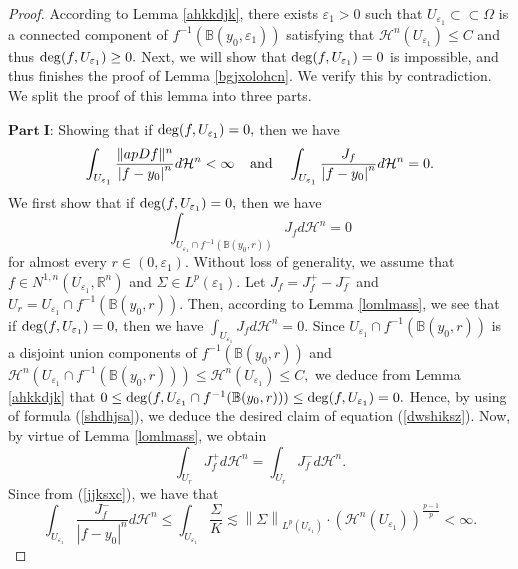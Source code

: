 \documentclass[11pt,twoside]{article}
\theoremstyle{definition}
\theoremstyle{remark}
\newcommand{\abs}[1]{\left|#1\right|}
\newcommand{\aleq}{\lesssim}
\begin{document}
\begin{proof}
According to Lemma \ref{ahkkdjk}, there exists $\varepsilon_{1}>0$ such that $U_{\varepsilon_{1}}\subset\subset\Omega$ is a connected component of $f^{-1}(\mathbb{B}(y_{0},\varepsilon_{1}))$ satisfying that 
$\mathcal{H}^{n}(U_{\varepsilon_{1}})\leq C$ and thus ${\rm deg}(f,U_{\varepsilon_{1}})\geq0.$ Next, we will show that  ${\rm deg}(f,U_{\varepsilon_{1}})=0$ is impossible, and thus finishes the proof of 
Lemma \ref{bgjxolohcn}. We verify this by contradiction. We split the proof of this lemma into three parts.

$\mathbf{Part}\;\mathbf{I}$: Showing that if ${\rm deg}(f,U_{\varepsilon_{1}})=0,$ then we have 
$$\int_{U_{\varepsilon_{1}}}\frac{\|apDf\|^{n}}{\abs{f-y_{0}}^{n}}d\mathcal{H}^{n}<\infty\;\;\;\;{\rm and }\;\;\;\;\int_{U_{\varepsilon_{1}}}\frac{J_{f}}{\abs{f-y_{0}}^{n}}d\mathcal{H}^{n}=0.$$
We first show that if
${\rm deg}(f,U_{\varepsilon_{1}})=0,$ then  we have 
\begin{equation}\label{dwshiksz}
\int_{U_{\varepsilon_{1}}\cap f^{-1}(\mathbb{B}(y_{0},r))}J_{f}d\mathcal{H}^{n}=0
\end{equation}
for almost every $r\in(0,\varepsilon_{1}).$ Without loss of generality, we assume that $f\in N^{1,n}(U_{\varepsilon_{1}},\mathbb{R}^{n})$ and  $\Sigma\in L^{p}(\varepsilon_{1}).$
Let $J_{f}=J_{f}^{+}-J_{f}^{-}$ and $U_{r}=U_{\varepsilon_{1}}\cap f^{-1}(\mathbb{B}(y_{0},r)).$ Then, according to Lemma \ref{lomlmass}, we see that if ${\rm deg}(f,U_{\varepsilon_{1}})=0,$ then we have $\int_{U_{\varepsilon_{1}}}J_{f}d\mathcal{H}^{n}=0.$ Since $U_{\varepsilon_{1}}\cap f^{-1}(\mathbb{B}(y_{0},r))$
is a disjoint union components of $f^{-1}(\mathbb{B}(y_{0},r))$ and $\mathcal{H}^{n}(U_{\varepsilon_{1}}\cap f^{-1}(\mathbb{B}(y_{0},r)))\leq\mathcal{H}^{n}(U_{\varepsilon_{1}})\leq C,$ 
we deduce from Lemma \ref{ahkkdjk} that $0\leq{\rm deg}(f,U_{\varepsilon_{1}}\cap f^{-1}(\mathbb{B}(y_{0},r)))\leq{\rm deg}(f,U_{\varepsilon_{1}})=0.$ 
 Hence, by using of formula (\ref{shdhjsa}), we deduce the desired claim of equation (\ref{dwshiksz}).
Now, by virtue of Lemma \ref{lomlmass}, we obtain
 \begin{equation}\label{ed2rf2}
 \int_{U_{r}}J_{f}^{+}d\mathcal{H}^{n}=\int_{U_{r}}J_{f}^{-}d\mathcal{H}^{n}.
 \end{equation}
 Since from (\ref{jjksxc}), we have that 
$$\int_{U_{\varepsilon_{1}}}\frac{J_{f}^{-}}{\abs{f-y_{0}}^{n}}d\mathcal{H}^{n}\leq\int_{U_{\varepsilon_{1}}}\frac{\Sigma}{K}\aleq\left\|\Sigma\right\|_{L^{p}(U_{\varepsilon_{1}})}\cdot (\mathcal{H}^{n}(U_{\varepsilon_{1}}))^{\frac{p-1}{p}}<\infty.$$

\end{proof}
\end{document}
